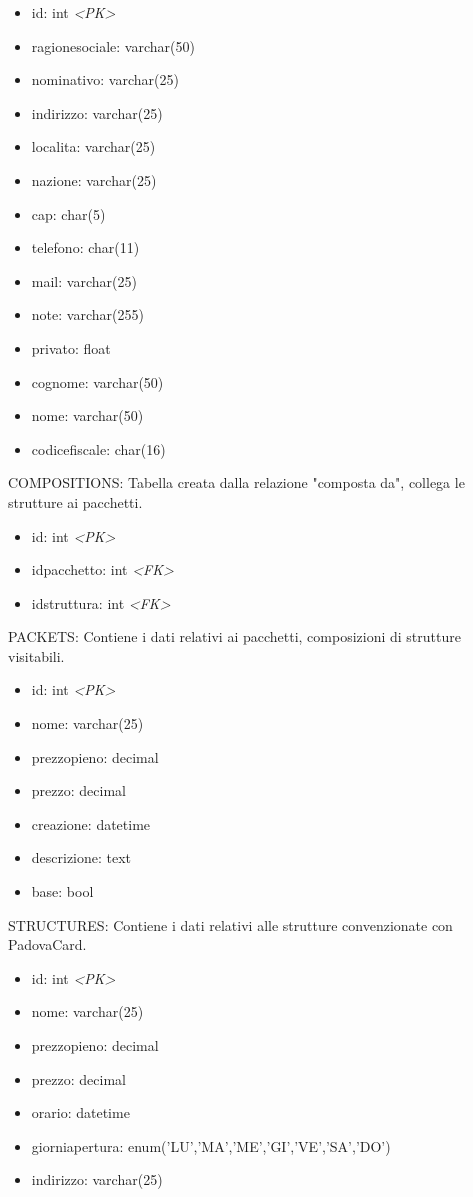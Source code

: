 \begin{itemize}
\item id: int \textit{\textless PK\textgreater}
\item ragionesociale: varchar(50)
\item nominativo: varchar(25)
\item indirizzo: varchar(25)
\item localita: varchar(25)
\item nazione: varchar(25)
\item cap: char(5)
\item telefono: char(11)
\item mail: varchar(25)
\item note: varchar(255)
\item privato: float
\item cognome: varchar(50)
\item nome: varchar(50)
\item codicefiscale: char(16)
\end{itemize}
COMPOSITIONS: Tabella creata dalla relazione "composta da", collega le strutture ai pacchetti.
\begin{itemize}
\item id: int \textit{\textless PK\textgreater}
\item idpacchetto: int \textit{\textless FK\textgreater}
\item idstruttura: int \textit{\textless FK\textgreater}
\end{itemize}
PACKETS: Contiene i dati relativi ai pacchetti, composizioni di strutture visitabili.
\begin{itemize}
\item id: int \textit{\textless PK\textgreater}
\item nome: varchar(25)
\item prezzopieno: decimal
\item prezzo: decimal
\item creazione: datetime
\item descrizione: text
\item base: bool
\end{itemize}
STRUCTURES: Contiene i dati relativi alle strutture convenzionate con PadovaCard.
\begin{itemize}
\item id: int \textit{\textless PK\textgreater}
\item nome: varchar(25)
\item prezzopieno: decimal
\item prezzo: decimal
\item orario: datetime
\item giorniapertura: enum('LU','MA','ME','GI','VE','SA','DO')
\item indirizzo: varchar(25)
\end{itemize}
